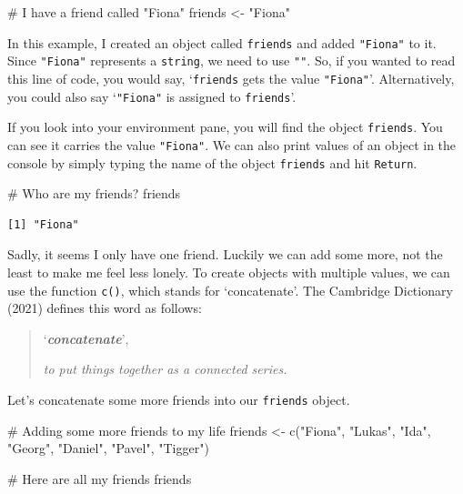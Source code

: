 \documentclass[
  letterpaper,
  DIV=11,
  numbers=noendperiod]{scrreprt}
\newenvironment{Shaded}{\begin{snugshade}}{\end{snugshade}}
\newcommand{\CommentTok}[1]{\textcolor[rgb]{0.37,0.37,0.37}{#1}}
\newcommand{\FunctionTok}[1]{\textcolor[rgb]{0.28,0.35,0.67}{#1}}
\newcommand{\NormalTok}[1]{\textcolor[rgb]{0.00,0.23,0.31}{#1}}
\newcommand{\OtherTok}[1]{\textcolor[rgb]{0.00,0.23,0.31}{#1}}
\newcommand{\StringTok}[1]{\textcolor[rgb]{0.13,0.47,0.30}{#1}}
\begin{document}
\begin{Shaded}
\begin{Highlighting}[]
\CommentTok{\# I have a friend called "Fiona"}
\NormalTok{friends }\OtherTok{\textless{}{-}} \StringTok{"Fiona"}
\end{Highlighting}
\end{Shaded}

In this example, I created an object called \texttt{friends} and added
\texttt{"Fiona"} to it. Since \texttt{"Fiona"} represents a
\texttt{string}, we need to use \texttt{""}. So, if you wanted to read
this line of code, you would say, `\texttt{friends} gets the value
\texttt{"Fiona"}'. Alternatively, you could also say `\texttt{"Fiona"}
is assigned to \texttt{friends}'.

If you look into your environment pane, you will find the object
\texttt{friends}. You can see it carries the value \texttt{"Fiona"}. We
can also print values of an object in the console by simply typing the
name of the object \texttt{friends} and hit \texttt{Return}.

\begin{Shaded}
\begin{Highlighting}[]
\CommentTok{\# Who are my friends?}
\NormalTok{friends}
\end{Highlighting}
\end{Shaded}

\begin{verbatim}
[1] "Fiona"
\end{verbatim}

Sadly, it seems I only have one friend. Luckily we can add some more,
not the least to make me feel less lonely. To create objects with
multiple values, we can use the function \texttt{c()}, which stands for
`concatenate'. The Cambridge Dictionary (2021) defines this word as
follows:

\begin{quote}
`\textbf{\emph{concatenate}}',

\emph{to put things together as a connected series.}
\end{quote}

Let's concatenate some more friends into our \texttt{friends} object.

\begin{Shaded}
\begin{Highlighting}[]
\CommentTok{\# Adding some more friends to my life}
\NormalTok{friends }\OtherTok{\textless{}{-}} \FunctionTok{c}\NormalTok{(}\StringTok{"Fiona"}\NormalTok{,}
             \StringTok{"Lukas"}\NormalTok{,}
             \StringTok{"Ida"}\NormalTok{,}
             \StringTok{"Georg"}\NormalTok{,}
             \StringTok{"Daniel"}\NormalTok{,}
             \StringTok{"Pavel"}\NormalTok{,}
             \StringTok{"Tigger"}\NormalTok{)}

\CommentTok{\# Here are all my friends}
\NormalTok{friends}
\end{Highlighting}
\end{Shaded}
\end{document}
